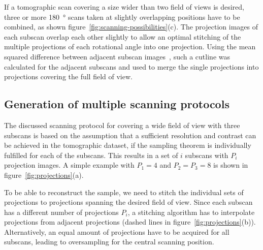If a tomographic scan covering a size wider than two field of views is desired, three or more \SI{180}{\degree} scans taken at slightly overlapping positions have to be combined, as shown figure~\ref{fig:scanning-possibilities}(c). The projection images of each subscan overlap each other slightly to allow an optimal stitching of the multiple projections of each rotational angle into one projection. Using the mean squared difference between adjacent subscan images~\cite{Hintermueller2009}, such a cutline was calculated for the adjacent subscans and used to merge the single projections into projections covering the full field of view.

\subsection{Generation of multiple scanning protocols}%
The discussed scanning protocol for covering a wide field of view with three subscans is based on the assumption that a sufficient resolution and contrast can be achieved in the tomographic dataset, if the sampling theorem is individually fulfilled for each of the subscans. This results in a set of $i$ subscans with $P_{i}$ projection images. A simple example with $P_{1}=4$ and $P_{2}=P_{3}=8$ is shown in figure~\ref{fig:projections}(a).

To be able to reconstruct the sample, we need to stitch the individual sets of projections to projections spanning the desired field of view. Since each subscan has a different number of projections $P_{i}$, a stitching algorithm has to interpolate projections from adjacent projections (dashed lines in figure~\ref{fig:projections}(b)). Alternatively, an equal amount of projections have to be acquired for all subscans, leading to oversampling for the central scanning position.

